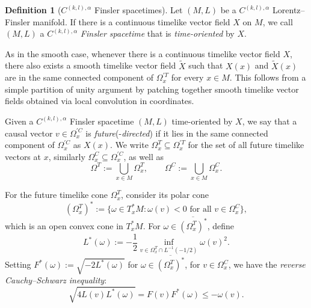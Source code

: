 \documentclass[a4paper,11pt]{article}
\numberwithin{equation}{section}
\theoremstyle{definition}
\newtheorem{Definition}{Definition}[section]
\theoremstyle{plain}
\begin{document}
\begin{Definition}[$C^{(k,l),\alpha}$ Finsler spacetimes]
Let $(M,L)$ be a $C^{(k,l),\alpha}$ Lorentz--Finsler manifold. 
If there is a continuous timelike vector field $X$ on $M$, we call $(M,L)$ a $C^{(k,l),\alpha}$ \emph{Finsler spacetime} that is \emph{time-oriented} by $X$.
\end{Definition}

As in the smooth case, whenever there is a continuous timelike vector field $X$, there also exists a smooth timelike vector field $\widetilde{X}$ such that $X(x)$ and $\widetilde{X}(x)$ are in the same connected component of $\Omega_x^{'T}$ for every $x \in M$. 
This follows from a simple partition of unity argument by patching together smooth timelike vector fields obtained via local convolution in coordinates.

Given a $C^{(k,l), \alpha}$ Finsler spacetime $(M,L)$ time-oriented by $X$, we say that a causal vector $v \in \Omega_x^{'C}$ is \emph{future}(-\emph{directed}) if it lies in the same connected component of $\Omega_x^{'C}$ as $X(x)$.
We write $\Omega_x^T \subseteq \Omega_x^{'T}$ for the set of all future timelike vectors at $x$, similarly $\Omega_x^C \subseteq \Omega_x^{'C}$, as well as
\begin{equation*}
    \Omega^T := \bigcup_{ x \in M} \Omega_x^T, \qquad \Omega^C:=\bigcup_{x \in M} \Omega_x^C.
\end{equation*}


For the future timelike cone $\Omega^T_x$, consider its polar cone
\[
(\Omega^T_x)^*:=\bigl\{ \omega \in T_x^*M : \omega(v) < 0
\text{ for all $v \in \Omega^C_x$} \bigr\},
\]
which is an open convex cone in $T_x^*M$. 
For $\omega \in \overline{(\Omega_x^T)^*}$, define 
\begin{equation*}
    L^*(\omega) := -\frac{1}{2} \inf_{v \in \Omega_x^T \cap L^{-1}(-1/2)} \omega(v)^2.
\end{equation*}
Setting $F^*(\omega):=\sqrt{-2L^*(\omega)}$ for $\omega \in \overline{(\Omega_x^T)^*}$, for $v \in \Omega_x^C$, we have the \emph{reverse Cauchy--Schwarz inequality}:
\begin{equation*}
    \sqrt{4 L(v) L^*(\omega)} = F(v) F^*(\omega) \leq -\omega(v).
\end{equation*}
\end{document}
